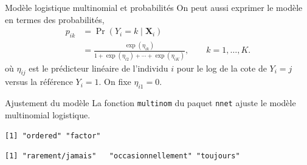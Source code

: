 \documentclass[
  ignorenonframetext,
]{beamer}
\newenvironment{Shaded}{\begin{snugshade}}{\end{snugshade}}
\newcommand{\AttributeTok}[1]{\textcolor[rgb]{0.40,0.45,0.13}{#1}}
\newcommand{\CommentTok}[1]{\textcolor[rgb]{0.37,0.37,0.37}{#1}}
\newcommand{\FunctionTok}[1]{\textcolor[rgb]{0.28,0.35,0.67}{#1}}
\newcommand{\NormalTok}[1]{\textcolor[rgb]{0.00,0.23,0.31}{#1}}
\newcommand{\SpecialCharTok}[1]{\textcolor[rgb]{0.37,0.37,0.37}{#1}}
\newcommand{\StringTok}[1]{\textcolor[rgb]{0.13,0.47,0.30}{#1}}
\begin{document}
\begin{frame}{Modèle logistique multinomial et probabilités}
\label{moduxe8le-logistique-multinomial-et-probabilituxe9s}
On peut aussi exprimer le modèle en termes des probabilités,
\begin{align*}
 p_{ik} &= \Pr(Y_i=k \mid \mathbf{X}_i) \\&= \frac{\exp(\eta_{ik})}{1+ \exp(\eta_{i2}) + \cdots + \exp(\eta_{iK})}, \qquad k=1, \ldots, K.
\end{align*} où \(\eta_{ij}\) est le prédicteur linéaire de l'individu
\(i\) pour le log de la cote de \(Y_i=j\) versus la référence \(Y_i=1\).
On fixe \(\eta_{i1}=0\).
\end{frame}

\begin{frame}[fragile]{Ajustement du modèle}
\label{ajustement-du-moduxe8le}
La fonction \texttt{multinom} du paquet \texttt{nnet} ajuste le modèle
multinomial logistique.

\begin{Shaded}
\end{Shaded}

\begin{verbatim}
[1] "ordered" "factor" 
\end{verbatim}

\begin{Shaded}
\end{Shaded}

\begin{verbatim}
[1] "rarement/jamais"   "occasionnellement" "toujours"         
\end{verbatim}


\end{frame}
\end{document}

